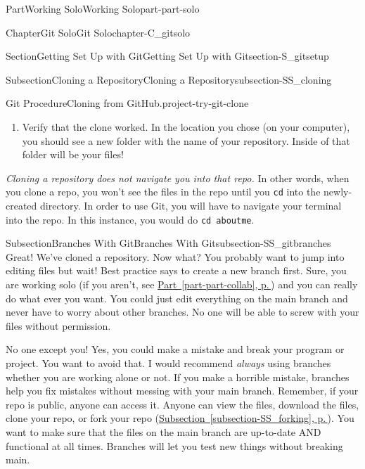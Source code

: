 \documentclass[twoside,10pt,]{book}
\newcommand{\xreffont}{\relax}
\newcommand{\mono}[1]{\texttt{#1}}
\newcommand{\acronym}[1]{\textsc{\MakeLowercase{#1}}}
\begin{document}
\begin{partptx}{Part}{Working Solo}{}{Working Solo}{}{}{part-part-solo}
\begin{chapterptx}{Chapter}{Git Solo}{}{Git Solo}{}{}{chapter-C_gitsolo}
\begin{sectionptx}{Section}{Getting Set Up with Git}{}{Getting Set Up with Git}{}{}{section-S_gitsetup}
\begin{subsectionptx}{Subsection}{Cloning a Repository}{}{Cloning a Repository}{}{}{subsection-SS_cloning}
\begin{project}{Git Procedure}{Cloning from GitHub.}{project-try-git-clone}
\begin{enumerate}[font=\bfseries,label=(\alph*),ref=\alph*]
\par
Your terminal may ask you for your GitHub username and password. This is ok: enter your username and instead of typing your normal GitHub password, paste\slash{}type your \acronym{PAT} as found in \hyperref[project-gitproc-pat]{Git Procedure~{\xreffont\ref{project-gitproc-pat}}, p.\,\pageref{project-gitproc-pat}}.%
\item{}Verify that the clone worked. In the location you chose (on your computer), you should see a new folder with the name of your repository. Inside of that folder will be your files!%
\end{enumerate}%
\end{project}%
\emph{Cloning a repository does not navigate you into that repo.} In other words, when you clone a repo, you won't see the files in the repo until you \mono{cd} into the newly-created directory. In order to use Git, you will have to navigate your terminal into the repo. In this instance, you would do \mono{cd aboutme}.%
\end{subsectionptx}
%
%
\typeout{************************************************}
\typeout{************************************************}
%
\begin{subsectionptx}{Subsection}{Branches With Git}{}{Branches With Git}{}{}{subsection-SS_gitbranches}
%
%
Great! We've cloned a repository. Now what? You probably want to jump into editing files but wait! Best practice says to create a new branch first. Sure, you are working solo (if you aren't, see \hyperref[part-part-collab]{Part~{\xreffont\ref{part-part-collab}}, p.\,\pageref{part-part-collab}}) and you can really do what ever you want. You could just edit everything on the main branch and never have to worry about other branches. No one will be able to screw with your files without permission.%
\par
No one except you! Yes, you could make a mistake and break your program or project. You want to avoid that. I would recommend \emph{always} using branches whether you are working alone or not. If you make a horrible mistake, branches help you fix mistakes without messing with your main branch. Remember, if your repo is public, anyone can access it. Anyone can view the files, download the files, clone your repo, or fork your repo (\hyperref[subsection-SS_forking]{Subsection~{\xreffont\ref{subsection-SS_forking}}, p.\,\pageref{subsection-SS_forking}}). You want to make sure that the files on the main branch are up-to-date AND functional at all times. Branches will let you test new things without breaking main.%

\end{subsectionptx}
\end{sectionptx}
\end{chapterptx}
\end{partptx}
\end{document}
